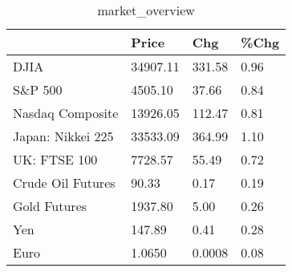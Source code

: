 \documentclass{article}%
\begin{document}
%


\begin{table}[htbp]%
\caption{market\_overview}%
\centering%
\begin{adjustbox}{width=1\textwidth}%
\begin{tabular}{llll}
\toprule
                  &    Price &    Chg & \%Chg \\
\midrule
             DJIA & 34907.11 & 331.58 & 0.96 \\
          S\&P 500 &  4505.10 &  37.66 & 0.84 \\
 Nasdaq Composite & 13926.05 & 112.47 & 0.81 \\
Japan: Nikkei 225 & 33533.09 & 364.99 & 1.10 \\
     UK: FTSE 100 &  7728.57 &  55.49 & 0.72 \\
Crude Oil Futures &    90.33 &   0.17 & 0.19 \\
     Gold Futures &  1937.80 &   5.00 & 0.26 \\
              Yen &   147.89 &   0.41 & 0.28 \\
             Euro &   1.0650 & 0.0008 & 0.08 \\
\bottomrule
\end{tabular}
%
\end{adjustbox}%
\end{table}

%
\end{document}
